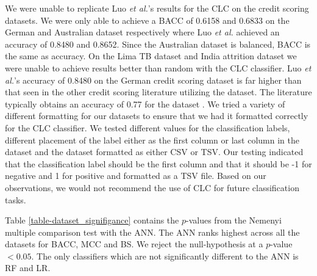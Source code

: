 \documentclass{sig-alternate-05-2015}
\begin{document}
	We were unable to replicate Luo \textit{et al.}'s \cite{Luo20097562} results for the CLC on the credit scoring datasets. We were only able to achieve a BACC of 0.6158 and 0.6833 on the German and Australian dataset respectively where Luo \textit{et al.} achieved an accuracy of 0.8480 and 0.8652. Since the Australian dataset is balanced, BACC is the same as accuracy. On the Lima TB dataset and India attrition dataset we were unable to achieve results better than random with the CLC classifier. Luo \textit{et al.}'s accuracy of 0.8480 on the German credit scoring dataset is far higher than that seen in the other credit scoring literature utilizing the dataset. The literature typically obtains an accuracy of 0.77 for the dataset \cite{Huang2007847, Nanni20093028, Tsai20082639, Wang2011223}. We tried a variety of different formatting for our datasets to ensure that we had it formatted correctly for the CLC classifier. We tested different values for the classification labels, different placement of the label either as the first column or last column in the dataset and the dataset formatted as either CSV or TSV. Our testing indicated that the classification label should be the first column and that it should be -1 for negative and 1 for positive and formatted as a TSV file. Based on our observations, we would not recommend the use of CLC for future classification tasks.	
	
	Table \ref{table-dataset_signifigance} contains the $p$-values from the Nemenyi multiple comparison test with the ANN. The ANN ranks highest across all the datasets for BACC, MCC and BS. We reject the null-hypothesis at a $p$-value $< 0.05$. The only classifiers which are not significantly different to the ANN is RF and LR.
	
\end{document}
